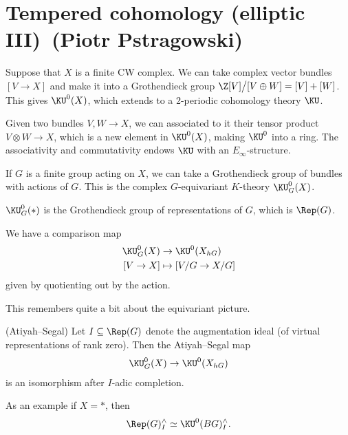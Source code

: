 \renewcommand{\thespeaker}{Piotr Pstragowski}
\renewcommand{\thetitle}{Tempered cohomology (elliptic III)}
\section{\thetitle~(\thespeaker)}
\providecommand{\OSpc}{\texttt{OSpc}}
\let\v\check
\providecommand{\Spec}{\text{Spec}}
\providecommand{\CP}{\mathbb{C}\text{P}}

Suppose that $X$ is a finite CW complex. We can take complex vector bundles $[V \to X]$ and make it into a Grothendieck group $\Z[V] \big/ [V \oplus W] = [V] + [W]$. This gives $\KU^0(X)$, which extends to a 2-periodic cohomology theory $\KU$.

Given two bundles $V,W \to X$, we can associated to it their tensor product $V \otimes W \to X$, which is a new element in $\KU^0(X)$, making $\KU^0$ into a ring. The associativity and commutativity endows $\KU$ with an $E_\infty$-structure.

If $G$ is a finite group acting on $X$, we can take a Grothendieck group of bundles with actions of $G$. This is the complex $G$-equivariant $K$-theory $\KU_G^0(X)$.

\begin{example} $\KU_G^0(\ast)$ is the Grothendieck group of representations of $G$, which is $\Rep(G)$.
\end{example}

We have a comparison map
\begin{align*}
    \KU_G^0(X) &\to \KU^0(X_{hG}) \\
    \left[ V \to X \right] &\mapsto \left[ V/G \to X/G \right] 
\end{align*}
given by quotienting out by the action.

This remembers quite a bit about the equivariant picture.

\begin{theorem} (Atiyah--Segal) Let $I \subseteq \Rep(G)$ denote the augmentation ideal (of virtual representations of rank zero). Then the Atiyah--Segal map
\begin{align*}
    \KU_G^0(X) \to \KU^0(X_{hG})
\end{align*}
is an isomorphism after $I$-adic completion.
\end{theorem}
As an example if $X=\ast$, then
\begin{align*}
    \Rep(G)_I^\wedge \simeq \KU^0(BG)_I^\wedge.
\end{align*}

